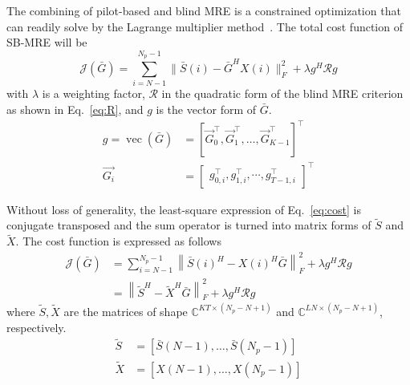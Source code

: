 The combining of pilot-based and blind MRE is a constrained optimization that can readily solve by the Lagrange multiplier method~\cite{bertsekas2014constrained}. The total cost function of SB-MRE will be
\begin{equation}
\label{eq:cost}
    \mathcal{J}(\bar{G})=\sum_{i=N-1}^{N_{p} - 1}\|\bar{S}(i)- \bar{G}^H X(i)\|_F^2 +\lambda g^H \mathcal{R} g
\end{equation}
with $\lambda$ is a weighting factor, $\mathcal{R}$ in the quadratic form of the blind MRE criterion as shown in Eq.~\ref{eq:R}, and $g$ is the vector form of $\bar{G}$.
\begin{equation}
\label{eq:vecG}
    \begin{aligned}
        g = \operatorname{vec}(\bar{G}) &=\left[\vec{G}_0^\top, \vec{G}_1^\top, \ldots, \vec{G}_{K-1}^\top\right]^\top \\
        \vec{G_i} &= \left[\begin{array}{ll}
        g_{0, i}^\top, g_{1, i}^\top, \cdots, g_{T-1, i}^\top
        \end{array}\right]^\top
    \end{aligned}
\end{equation}

Without loss of generality, the least-square expression of Eq.~\ref{eq:cost} is conjugate transposed and the sum operator is turned into matrix forms of $\widetilde{S}$ and $\widetilde{X}$. The cost function is expressed as follows
\begin{equation}
    \begin{aligned}
    \mathcal{J}(\bar{G})&=\sum_{i=N-1}^{N_{p} - 1}\left\|{\bar{S}(i)^H}-X(i)^H \bar{G}\right\|^2_F +\lambda g^H \mathcal{R} g\\
    &=\left\|\widetilde{S}^H-\widetilde{X}^H \bar{G}\right\|^2_F +\lambda g^H \mathcal{R} g
    \end{aligned}
\end{equation}
where $\widetilde{S}, \widetilde{X}$ are the matrices of shape $\mathbb{C}^{KT \times (N_p -N +1)}$ and $ \mathbb{C}^{LN \times (N_p-N+1)}$, respectively.
\begin{equation*}
    \begin{aligned}
        \widetilde{S} &= [\bar{S}(N-1), \ldots, \bar{S}\left(N_{p} - 1\right)] \\
        \widetilde{X} &= [X(N-1), \ldots, X\left(N_{p} - 1\right)]
    \end{aligned}
\end{equation*}


